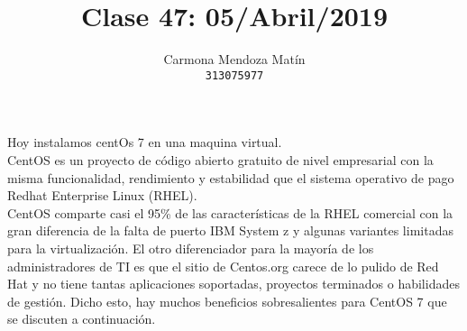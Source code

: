 \documentclass[11pt, a4paper]{report}
\begin{document}
\title{Clase 47: 05/Abril/2019}
\author{
  Carmona Mendoza Mat\'in\\
  \texttt{313075977}
}
\date{}
\maketitle

Hoy instalamos centOs 7 en una maquina virtual. \\

CentOS es un proyecto de código abierto gratuito de nivel empresarial con la
misma funcionalidad, rendimiento y estabilidad que el sistema operativo de pago
Redhat Enterprise Linux (RHEL). \\

CentOS comparte casi el 95\% de las características de la RHEL comercial con
la gran diferencia de la falta de puerto IBM System z y algunas variantes
limitadas para la virtualización. El otro diferenciador para la mayoría de los
administradores de TI es que el sitio de Centos.org carece de lo pulido de Red
Hat y no tiene tantas aplicaciones soportadas, proyectos terminados o
habilidades de gestión. Dicho esto, hay muchos beneficios sobresalientes para
CentOS 7 que se discuten a continuación. \\
\end{document}
